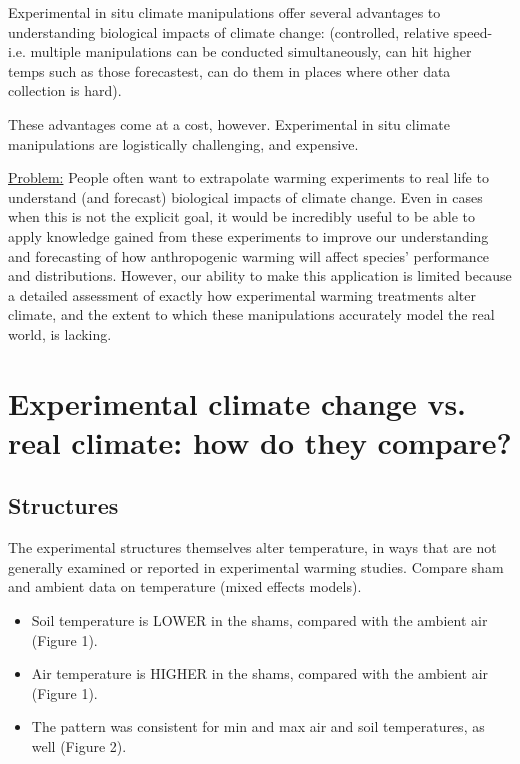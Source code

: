 \documentclass{article}
\begin{document}
\par Experimental in situ climate manipulations offer several advantages to understanding biological impacts of climate change: (controlled, relative speed- i.e. multiple manipulations can be conducted simultaneously, can hit higher temps such as those forecastest, can do them in places where other data collection is hard).
\par These advantages come at a cost, however. Experimental in situ climate
manipulations are logistically challenging, and expensive.
\par \underline{Problem:} People often want to extrapolate warming experiments to real life to understand (and forecast) biological impacts of climate change. Even in cases when this is not the explicit goal, it would be incredibly useful to be able to apply knowledge gained from these experiments to improve our understanding and forecasting of how anthropogenic warming will affect species' performance and distributions. However, our ability to make this application is limited because a detailed assessment of exactly how experimental warming treatments alter climate, and the extent to which these manipulations accurately model the real world,
is lacking.
\section {Experimental climate change vs. real climate:
how do they compare?}
\subsection {Structures}
The experimental structures themselves alter temperature, in ways that are
not generally examined or reported in experimental warming studies. Compare
sham and ambient data on temperature (mixed effects models).
\begin{itemize}
\item Soil temperature is LOWER in the shams, compared with the ambient
air (Figure 1).
\item Air temperature is HIGHER in the shams, compared with the ambient
air (Figure 1).
\item The pattern was consistent for min and max air and soil temperatures, as
well (Figure 2).
\end{itemize}
\end{document}
